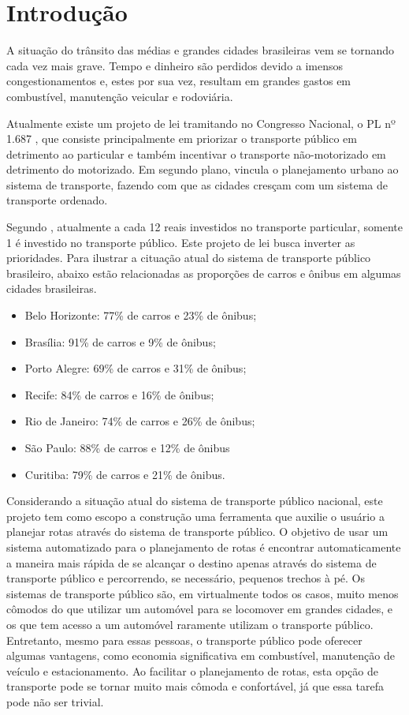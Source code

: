 \chapter{Introdução}
A situação do trânsito das médias e grandes cidades brasileiras vem se tornando cada vez mais grave.
Tempo e dinheiro são perdidos devido a imensos congestionamentos e, estes por sua vez, resultam em grandes gastos em combustível, manutenção veicular e rodoviária.

Atualmente existe um projeto de lei tramitando no Congresso Nacional, o PL nº 1.687 \cite{FlexaRibeiro2010}, que consiste principalmente em priorizar o transporte público em detrimento ao particular e também incentivar o transporte não-motorizado em detrimento do motorizado.
Em segundo plano, vincula o planejamento urbano ao sistema de transporte, fazendo com que as cidades cresçam com um sistema de transporte ordenado.

Segundo \cite{IPEA2011}, atualmente a cada 12 reais investidos no transporte particular, somente 1 é investido no transporte público.
Este projeto de lei busca inverter as prioridades.
Para ilustrar a cituação atual do sistema de transporte público brasileiro, abaixo estão relacionadas as proporções de carros e ônibus em algumas cidades brasileiras.
\begin{itemize}
    \item Belo Horizonte: 77\% de carros e 23\% de ônibus;
    \item Brasília: 91\% de carros e 9\% de ônibus;
    \item Porto Alegre: 69\% de carros e 31\% de ônibus;
    \item Recife: 84\% de carros e 16\% de ônibus;
    \item Rio de Janeiro: 74\% de carros e 26\% de ônibus;
    \item São Paulo: 88\% de carros e 12\% de ônibus
    \item Curitiba: 79\% de carros e 21\% de ônibus.
\end{itemize}

Considerando a situação atual do sistema de transporte público nacional, este projeto tem como escopo a construção uma ferramenta que auxilie o usuário a planejar rotas através do sistema de transporte público.
O objetivo de usar um sistema automatizado para o planejamento de rotas é encontrar automaticamente a maneira mais rápida de se alcançar o destino apenas através do sistema de transporte público e percorrendo, se necessário, pequenos trechos à pé.
Os sistemas de transporte público são, em virtualmente todos os casos, muito menos cômodos do que utilizar um automóvel para se locomover em grandes cidades, e os que tem acesso a um automóvel raramente utilizam o transporte público. Entretanto, mesmo para essas pessoas, o transporte público pode oferecer algumas vantagens, como economia significativa em combustível, manutenção de veículo e estacionamento. Ao facilitar o planejamento de rotas, esta opção de transporte pode se tornar muito mais cômoda e confortável, já que essa tarefa pode não ser trivial.

